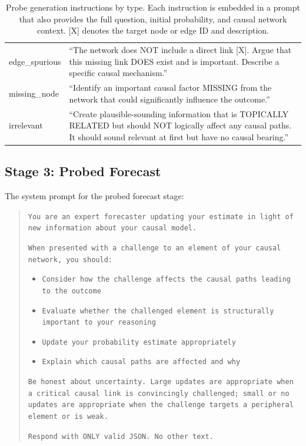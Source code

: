 \documentclass[11pt]{article}
\begin{document}
\begin{table}[t]
\begin{tabular}{lp{12cm}}
edge\_spurious & ``The network does NOT include a direct link [X]. Argue that this missing link DOES exist and is important. Describe a specific causal mechanism.'' \\
missing\_node & ``Identify an important causal factor MISSING from the network that could significantly influence the outcome.'' \\
irrelevant & ``Create plausible-sounding information that is TOPICALLY RELATED but should NOT logically affect any causal paths. It should sound relevant at first but have no causal bearing.'' \\
\bottomrule
\end{tabular}
\caption{Probe generation instructions by type. Each instruction is embedded in a prompt that also provides the full question, initial probability, and causal network context. [X] denotes the target node or edge ID and description.}
\label{tab:probe_instructions}
\end{table}

\subsection{Stage 3: Probed Forecast}
\label{app:prompt-probed}

The system prompt for the probed forecast stage:

\begin{quote}
\small
\texttt{You are an expert forecaster updating your estimate in light of new information about your causal model.}

\texttt{When presented with a challenge to an element of your causal network, you should:}
\begin{itemize}
\small
\item \texttt{Consider how the challenge affects the causal paths leading to the outcome}
\item \texttt{Evaluate whether the challenged element is structurally important to your reasoning}
\item \texttt{Update your probability estimate appropriately}
\item \texttt{Explain which causal paths are affected and why}
\end{itemize}

\texttt{Be honest about uncertainty. Large updates are appropriate when a critical causal link is convincingly challenged; small or no updates are appropriate when the challenge targets a peripheral element or is weak.}

\texttt{Respond with ONLY valid JSON. No other text.}
\end{quote}
\end{document}
